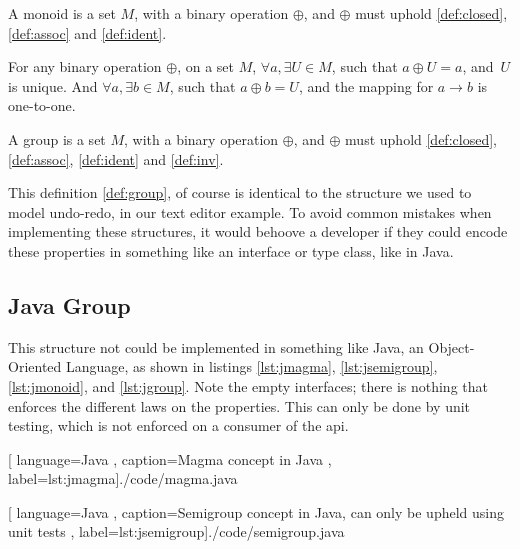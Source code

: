 \begin{definition}[Monoid] \label{def:monoid}
  A monoid is a set $M$, with a binary operation $\oplus$, and $\oplus$ must
  uphold \ref{def:closed}, \ref{def:assoc} and \ref{def:ident}.
\end{definition}

\begin{definition} \label{def:inv}
  For any binary operation $\oplus$, on a set $M$,
  $\forall a, \exists U \in M$, such that
  $a \oplus U = a$, and $U$ is unique.
  And $\forall a, \exists b \in M$, such that $a \oplus b = U$, and the mapping
  for $a \to b$ is one-to-one.
\end{definition}

\begin{definition}[Group] \label{def:group}
  A group is a set $M$, with a binary operation $\oplus$, and $\oplus$ must
  uphold \ref{def:closed}, \ref{def:assoc}, \ref{def:ident} and \ref{def:inv}.
\end{definition}

This definition \ref{def:group}, of course is identical to the structure we used
to model undo-redo, in our text editor example. To avoid common mistakes when
implementing these structures, it would behoove a developer if they could encode
these properties in something like an interface or type class, like in Java.

\subsection{Java Group}

This structure not could be implemented in something like Java, an
Object-Oriented Language, as shown in listings \ref{lst:jmagma},
\ref{lst:jsemigroup}, \ref{lst:jmonoid}, and \ref{lst:jgroup}. Note the empty
interfaces; there is nothing that enforces the different laws on the properties.
This can only be done by unit testing, which is not enforced on a consumer of
the \gls{api}.

\begin{center}
  
    [ language=Java
    , caption={Magma concept in Java}
    , label=lst:jmagma]{./code/magma.java}
\end{center}

\begin{center}
  
    [ language=Java
    , caption={Semigroup concept in Java, can only be upheld using unit tests}
    , label=lst:jsemigroup]{./code/semigroup.java}
\end{center}

